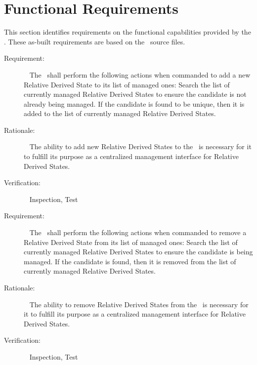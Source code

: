 \section{Functional Requirements}\label{sec:func_reqts}
This section identifies requirements on the functional
capabilities provided by the \relkinDesc.
These as-built requirements are based on the \relkinDesc\ source files.

\label{reqt:func_add_relstate}
\begin{description}
  \item[Requirement:]\ \newline
    The \relkinDesc\ shall perform the following actions when commanded to
    add a new Relative Derived State to its list of managed ones:
    Search the list of currently managed Relative Derived States to ensure
    the candidate is not already being managed.
    If the candidate is found to be unique, then it is added to the list of
    currently managed Relative Derived States.

  \item[Rationale:]\ \newline
    The ability to add new Relative Derived States to the \relkinDesc\ is
    necessary for it to fulfill its purpose as a centralized management
    interface for Relative Derived States.

  \item[Verification:]\ \newline
    Inspection, Test
\end{description}

\label{reqt:func_remove_relstate}
\begin{description}
  \item[Requirement:]\ \newline
    The \relkinDesc\ shall perform the following actions when commanded to
    remove a Relative Derived State from its list of managed ones:
    Search the list of currently managed Relative Derived States to ensure
    the candidate is being managed.
    If the candidate is found, then it is removed from the list of
    currently managed Relative Derived States.

  \item[Rationale:]\ \newline
    The ability to remove Relative Derived States from the \relkinDesc\ is
    necessary for it to fulfill its purpose as a centralized management
    interface for Relative Derived States.

  \item[Verification:]\ \newline
    Inspection, Test
\end{description}


